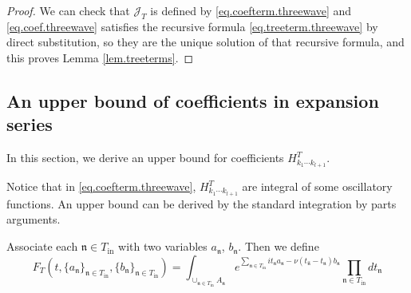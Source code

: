 \begin{proof}
We can check that $\mathcal{J}_T$ is defined by \eqref{eq.coefterm.threewave} and \eqref{eq.coef.threewave} satisfies the recursive formula \eqref{eq.treeterm.threewave} by direct substitution, so they are the unique solution of that recursive formula, and this proves Lemma \ref{lem.treeterms}.
\end{proof}



\subsection{An upper bound of coefficients in expansion series}\label{sec.uppcoef} In this section, we derive an upper bound for coefficients $H^T_{k_1\cdots k_{l+1}}$.

Notice that in \eqref{eq.coefterm.threewave}, $H^T_{k_1\cdots k_{l+1}}$ are integral of some oscillatory functions. An upper bound can be derived by the standard integration by parts arguments.

Associate each $\mathfrak{n}\in T_{\text{in}}$ with two variables $a_{\mathfrak{n}}$, $b_{\mathfrak{n}}$. Then we define
\begin{equation}\label{eq.defF_T.threewave}
F_{T}(t,\{a_{\mathfrak{n}}\}_{\mathfrak{n}\in T_{\text{in}}},\{b_{\mathfrak{n}}\}_{\mathfrak{n}\in T_{\text{in}}})=\int_{\cup_{\mathfrak{n}\in T_{\text{in}}} A_{\mathfrak{n}}} e^{\sum_{\mathfrak{n}\in T_{\text{in}}} it_{\mathfrak{n}} a_{\mathfrak{n}} - \nu(t_{\widehat{\mathfrak{n}}}-t_{\mathfrak{n}})b_{\mathfrak{n}}} \prod_{\mathfrak{n}\in T_{\text{in}}} dt_{\mathfrak{n}} 
\end{equation}

